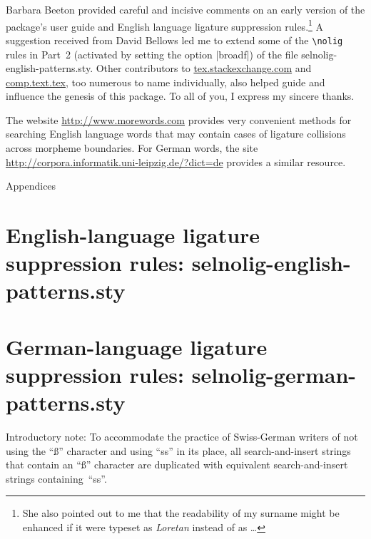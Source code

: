 \documentclass[11pt]{article}
\newcommand{\pkg}[1]{\textsf{#1}}
\newcommand{\cmmd}[1]{\texttt{\textbackslash #1}}
\let\oldappendix\appendix
\renewcommand\appendix{%
   \addtocontents{toc}{\protect{\vspace{1\baselineskip}}}
   \addtocontents{toc}{\protect{\mdseries Appendices\par}}
   \noindent
   {\Large Appendices}
   \oldappendix}
\begin{document}
Barbara Beeton provided careful and incisive comments on an early version of the package's user guide and English language ligature suppression rules.\footnote{She also pointed out to me that the readability of my surname might be enhanced if it were typeset as \emph{Loretan} instead of as \emph{}\dots} A suggestion received from David Bellows led me to extend some of the \cmmd{nolig} rules in Part~2 (activated by setting the option |broadf|) of the file \pkg{selnolig-english-patterns.sty}. Other contributors to \url{tex.stackexchange.com} and \url{comp.text.tex}, too numerous to name individually, also helped guide and influence the genesis of this package. To all of you, I express my sincere thanks.

The website \url{http://www.morewords.com} provides very convenient methods for searching English language words that may contain cases of ligature collisions across morpheme boundaries. For German words, the site \url{http://corpora.informatik.uni-leipzig.de/?dict=de} provides a similar resource. 


\clearpage
\appendix
\selnoligoff  %


\small %


\section[English-language ligature suppression rules: selnolig-english-patterns.sty]{English-language ligature suppression rules: 
\pkg{selnolig-english-patterns.sty}}
\label{sec:eng-listing}

\begin{multicols}{2}
\end{multicols}

\clearpage
\section[German-language ligature suppression rules:
selnolig-german-patterns.sty]{German-language ligature suppression rules: \pkg{selnolig-german-patterns.sty}}
\label{sec:germ-listing}

Introductory note: To accommodate the practice of Swiss-German writers of not using the \enquote{ß} character and using \enquote{ss} in its place, all search-and-insert strings that contain an \enquote{ß} character are duplicated with equivalent search-and-insert strings containing~\enquote{ss}.
\end{document}
